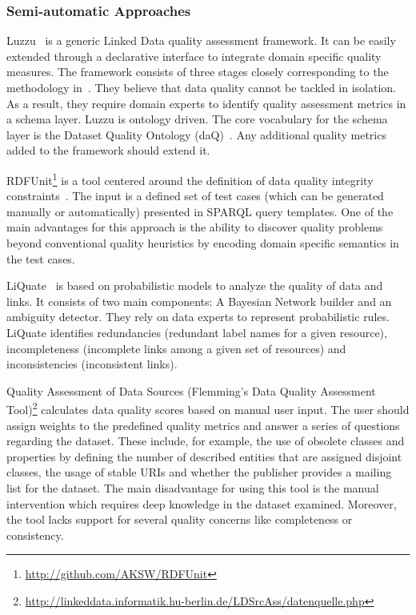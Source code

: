 \documentclass[onecolumn, crcready]{../../Tools/LaTEX/iosart2c}
\begin{document}
\subsubsection{Semi-automatic Approaches}

Luzzu~\cite{Debattista:CoRR:14} is a generic Linked Data quality assessment framework. It can be easily extended through a declarative interface to integrate domain specific quality measures. The framework consists of three stages closely corresponding to the methodology in~\cite{Anisa:LDQ:14}. They believe that data quality cannot be tackled in isolation. As a result, they require domain experts to identify quality assessment metrics in a schema layer. Luzzu is ontology driven. The core vocabulary for the schema layer is the Dataset Quality Ontology (daQ)~\cite{Debattista:WWW:14}. Any additional quality metrics added to the framework should extend it.

RDFUnit\footnote{\url{http://github.com/AKSW/RDFUnit}} is a tool centered around the definition of data quality integrity constraints~\cite{Kontokostas:WWW:14}. The input is a defined set of test cases (which can be generated manually or automatically) presented in SPARQL query templates. One of the main advantages for this approach is the ability to discover quality problems beyond conventional quality heuristics by encoding domain specific semantics in the test cases.

LiQuate~\cite{Ruckhaus:ESWC:14} is based on probabilistic models to analyze the quality of data and links. It consists of two main components: A Bayesian Network builder and an ambiguity detector. They rely on data experts to represent probabilistic rules. LiQuate identifies redundancies (redundant label names for a given resource), incompleteness (incomplete links among a given set of resources) and inconsistencies (inconsistent links).

Quality Assessment of Data Sources (Flemming's Data Quality Assessment Tool)\footnote{\url{http://linkeddata.informatik.hu-berlin.de/LDSrcAss/datenquelle.php}} calculates data quality scores based on manual user input. The user should assign weights to the predefined quality metrics and answer a series of questions regarding the dataset. These include, for example, the use of obsolete classes and properties by defining the number of described entities that are assigned disjoint classes, the usage of stable URIs and whether the publisher provides a mailing list for the dataset. The main disadvantage for using this tool is the manual intervention which requires deep knowledge in the dataset examined. Moreover, the tool lacks support for several quality concerns like completeness or consistency.
\end{document}
